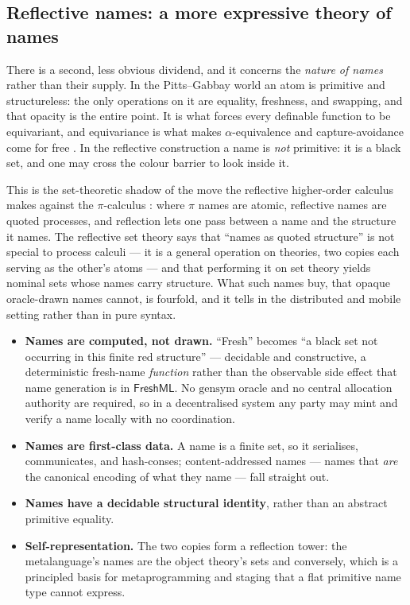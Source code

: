 \subsection{Reflective names: a more expressive theory of names}
\label{sec:applications:reflective}

There is a second, less obvious dividend, and it concerns the \emph{nature of
names} rather than their supply. In the Pitts--Gabbay world an atom is primitive
and structureless: the only operations on it are equality, freshness, and
swapping, and that opacity is the entire point. It is what forces every definable
function to be equivariant, and equivariance is what makes $\alpha$-equivalence
and capture-avoidance come for free \cite{DBLP:journals/fac/GabbayP02}. In the
reflective construction a name is \emph{not} primitive: it is a black set, and one
may cross the colour barrier to look inside it.

This is the set-theoretic shadow of the move the reflective higher-order calculus
makes against the $\pi$-calculus \cite{DBLP:journals/entcs/MeredithR05}: where
$\pi$ names are atomic, reflective names are quoted processes, and reflection lets
one pass between a name and the structure it names. The reflective set theory says
that ``names as quoted structure'' is not special to process calculi --- it is a
general operation on theories, two copies each serving as the other's atoms --- and
that performing it on set theory yields nominal sets whose names carry structure.
What such names buy, that opaque oracle-drawn names cannot, is fourfold, and it
tells in the distributed and mobile setting rather than in pure syntax.
\begin{itemize}
\item \textbf{Names are computed, not drawn.} ``Fresh'' becomes ``a black set not
  occurring in this finite red structure'' --- decidable and constructive, a
  deterministic fresh-name \emph{function} rather than the observable side effect
  that name generation is in $\mathsf{FreshML}$. No $\mathrm{gensym}$ oracle and no
  central allocation authority are required, so in a decentralised system any
  party may mint and verify a name locally with no coordination.
\item \textbf{Names are first-class data.} A name is a finite set, so it
  serialises, communicates, and hash-conses; content-addressed names --- names
  that \emph{are} the canonical encoding of what they name --- fall straight out.
\item \textbf{Names have a decidable structural identity}, rather than an
  abstract primitive equality.
\item \textbf{Self-representation.} The two copies form a reflection tower: the
  metalanguage's names are the object theory's sets and conversely, which is a
  principled basis for metaprogramming and staging that a flat primitive name type
  cannot express.
\end{itemize}

